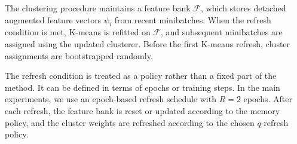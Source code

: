The clustering procedure maintains a feature bank \(\mathcal{F}\), which stores
detached augmented feature vectors \(\psi_i\) from recent minibatches. When the refresh condition
is met, K-means is refitted on \(\mathcal{F}\), and subsequent minibatches are assigned
using the updated clusterer. Before the first K-means refresh, cluster assignments are
bootstrapped randomly.

The refresh condition is treated as a policy rather than a fixed part of the method. It
can be defined in terms of epochs or training steps. In the main experiments, we use an
epoch-based refresh schedule with \(R=2\) epochs. After each refresh, the feature bank
is reset or updated according to the memory policy, and the cluster weights are refreshed
according to the chosen \(q\)-refresh policy.

